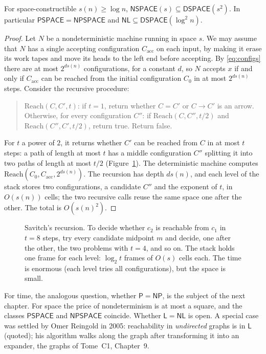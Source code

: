 \begin{theorem}[Savitch, 1970]\label{thm:savitch}
For space-constructible $s(n)\ge\log n$, $\mathsf{NSPACE}(s)\subseteq\mathsf{DSPACE}(s^2)$. In particular $\mathsf{PSPACE}=\mathsf{NPSPACE}$ and $\mathsf{NL}\subseteq\mathsf{DSPACE}(\log^2n)$.
\end{theorem}

\begin{proof}
Let $N$ be a nondeterministic machine running in space $s$. We may assume that $N$ has a single accepting configuration $C_{\mathrm{acc}}$ on each input, by making it erase its work tapes and move its heads to the left end before accepting. By \eqref{eq:configs} there are at most $2^{ds(n)}$ configurations, for a constant $d$, so $N$ accepts $x$ if and only if $C_{\mathrm{acc}}$ can be reached from the initial configuration $C_0$ in at most $2^{ds(n)}$ steps. Consider the recursive procedure:
\begin{quote}
$\mathrm{Reach}(C,C',t)$: if $t=1$, return whether $C=C'$ or $C\to C'$ is an arrow. Otherwise, for every configuration $C''$: if $\mathrm{Reach}(C,C'',t/2)$ and $\mathrm{Reach}(C'',C',t/2)$, return true. Return false.
\end{quote}
For $t$ a power of $2$, it returns whether $C'$ can be reached from $C$ in at most $t$ steps: a path of length at most $t$ has a middle configuration $C''$ splitting it into two paths of length at most $t/2$ (Figure~\ref{fig:savitch}). The deterministic machine computes $\mathrm{Reach}(C_0,C_{\mathrm{acc}},2^{ds(n)})$. The recursion has depth $ds(n)$, and each level of the stack stores two configurations, a candidate $C''$ and the exponent of $t$, in $O(s(n))$ cells; the two recursive calls reuse the same space one after the other. The total is $O(s(n)^2)$.
\end{proof}

\begin{figure}[ht]
\centering
{}
\caption{Savitch's recursion. To decide whether $c_2$ is reachable from $c_1$ in $t=8$ steps, try every candidate midpoint $m$ and decide, one after the other, the two problems with $t=4$, and so on. The stack holds one frame for each level: $\log_2t$ frames of $O(s)$ cells each. The time is enormous (each level tries all configurations), but the space is small.}
\label{fig:savitch}
\end{figure}

For time, the analogous question, whether $\mathsf P=\mathsf{NP}$, is the subject of the next chapter. For space the price of nondeterminism is at most a square, and the classes $\mathsf{PSPACE}$ and $\mathsf{NPSPACE}$ coincide. Whether $\mathsf L=\mathsf{NL}$ is open. A special case was settled by Omer Reingold in 2005: reachability in \emph{undirected} graphs is in $\mathsf L$ (quoted); his algorithm walks along the graph after transforming it into an expander, the graphs of Tome~C1, Chapter~9.


